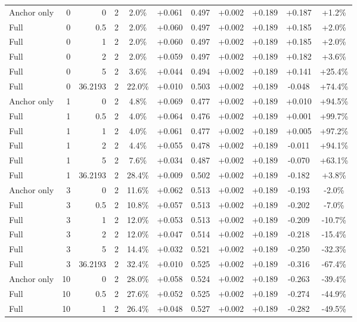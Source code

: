 \begin{table}[htbp]
\begin{tabular}{lrrrccccccc}
Anchor only & 0 & 0 & 2 & 2.0\% & +0.061 & 0.497 & +0.002 & +0.189 & +0.187 & +1.2\% \\
Full & 0 & 0.5 & 2 & 2.0\% & +0.060 & 0.497 & +0.002 & +0.189 & +0.185 & +2.0\% \\
Full & 0 & 1 & 2 & 2.0\% & +0.060 & 0.497 & +0.002 & +0.189 & +0.185 & +2.0\% \\
Full & 0 & 2 & 2 & 2.0\% & +0.059 & 0.497 & +0.002 & +0.189 & +0.182 & +3.6\% \\
Full & 0 & 5 & 2 & 3.6\% & +0.044 & 0.494 & +0.002 & +0.189 & +0.141 & +25.4\% \\
Full & 0 & 36.2193 & 2 & 22.0\% & +0.010 & 0.503 & +0.002 & +0.189 & -0.048 & +74.4\% \\
Anchor only & 1 & 0 & 2 & 4.8\% & +0.069 & 0.477 & +0.002 & +0.189 & +0.010 & +94.5\% \\
Full & 1 & 0.5 & 2 & 4.0\% & +0.064 & 0.476 & +0.002 & +0.189 & +0.001 & +99.7\% \\
Full & 1 & 1 & 2 & 4.0\% & +0.061 & 0.477 & +0.002 & +0.189 & +0.005 & +97.2\% \\
Full & 1 & 2 & 2 & 4.4\% & +0.055 & 0.478 & +0.002 & +0.189 & -0.011 & +94.1\% \\
Full & 1 & 5 & 2 & 7.6\% & +0.034 & 0.487 & +0.002 & +0.189 & -0.070 & +63.1\% \\
Full & 1 & 36.2193 & 2 & 28.4\% & +0.009 & 0.502 & +0.002 & +0.189 & -0.182 & +3.8\% \\
Anchor only & 3 & 0 & 2 & 11.6\% & +0.062 & 0.513 & +0.002 & +0.189 & -0.193 & -2.0\% \\
Full & 3 & 0.5 & 2 & 10.8\% & +0.057 & 0.513 & +0.002 & +0.189 & -0.202 & -7.0\% \\
Full & 3 & 1 & 2 & 12.0\% & +0.053 & 0.513 & +0.002 & +0.189 & -0.209 & -10.7\% \\
Full & 3 & 2 & 2 & 12.0\% & +0.047 & 0.514 & +0.002 & +0.189 & -0.218 & -15.4\% \\
Full & 3 & 5 & 2 & 14.4\% & +0.032 & 0.521 & +0.002 & +0.189 & -0.250 & -32.3\% \\
Full & 3 & 36.2193 & 2 & 32.4\% & +0.010 & 0.525 & +0.002 & +0.189 & -0.316 & -67.4\% \\
Anchor only & 10 & 0 & 2 & 28.0\% & +0.058 & 0.524 & +0.002 & +0.189 & -0.263 & -39.4\% \\
Full & 10 & 0.5 & 2 & 27.6\% & +0.052 & 0.525 & +0.002 & +0.189 & -0.274 & -44.9\% \\
Full & 10 & 1 & 2 & 26.4\% & +0.048 & 0.527 & +0.002 & +0.189 & -0.282 & -49.5\% \\

\end{tabular}
\end{table}
